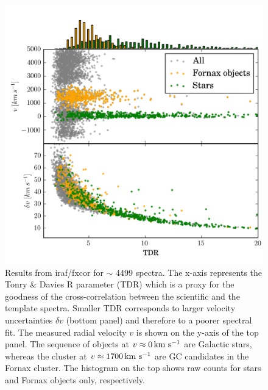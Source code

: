 \documentclass[useAMS,usenatbib]{mn2e}
\newcommand{\kms}{\mbox{\,km~s$^{-1}$}}
\begin{document}
\begin{figure}
\centering
\includegraphics[width=\columnwidth]{figures/fxcor_subplot.png} 
\caption{Results from iraf/fxcor for $\sim$ 4499 spectra. The x-axis represents 
the Tonry \& Davies R parameter (TDR) which is a proxy for the goodness of the 
cross-correlation between the scientific and the template spectra. Smaller TDR 
corresponds to larger velocity uncertainties $\delta v$ (bottom panel) and 
therefore to a poorer spectral fit. The measured radial velocity $v$ is shown 
on the y-axis of the top panel. The sequence of objects at $v\approx 0 \kms$ 
are Galactic stars, whereas the cluster at $v\approx1700\kms$ are GC candidates 
in the Fornax cluster. The histogram on the top shows raw counts for stars and 
Fornax objects only, respectively. }
\label{fig:tdr}
\end{figure}
\end{document}
